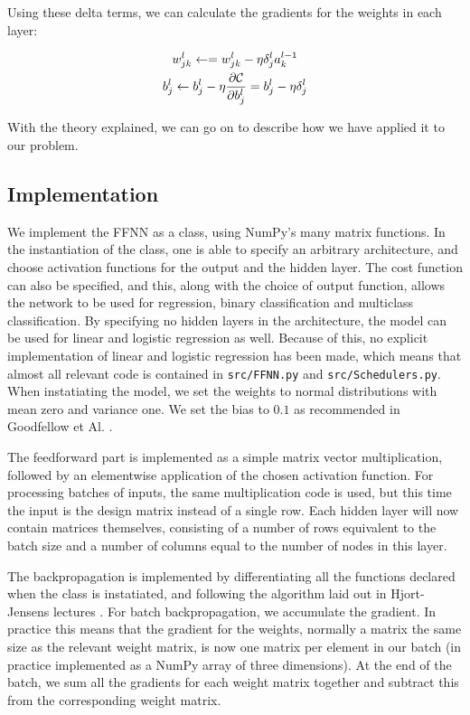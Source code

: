 \documentclass[onecolumn,10pt,cleanfoot]{asme2ej}
\begin{document}
Using these delta terms, we can calculate the gradients for the weights in each layer:

\begin{gather}
w_{jk}^l\leftarrow  = w_{jk}^l- \eta \delta_j^la_k^{l-1} \\
b_j^l \leftarrow b_j^l-\eta \frac{\partial {\cal C}}{\partial b_j^l}=b_j^l-\eta \delta_j^l
\end{gather}

With the theory explained, we can go on to describe how we have applied it to our problem.

\subsection{Implementation}

We implement the FFNN as a class, using NumPy's many matrix functions. In the instantiation of the class, one is able to specify an arbitrary architecture, and choose activation functions for the output and the hidden layer. The cost function can also be specified, and this, along with the choice of output function, allows the network to be used for regression, binary classification and multiclass classification. By specifying no hidden layers in the architecture, the model can be used for linear and logistic regression as well. Because of this, no explicit implementation of linear and logistic regression has been made, which means that almost all relevant code is contained in \texttt{src/FFNN.py} and \texttt{src/Schedulers.py}. When instatiating the model, we set the weights to normal distributions with mean zero and variance one. We set the bias to $0.1$ as recommended in Goodfellow et Al. \cite[189]{gbc}.

The feedforward part is implemented as a simple matrix vector multiplication, followed by an elementwise application of the chosen activation function. For processing batches of inputs, the same multiplication code is used, but this time the input is the design matrix instead of a single row. Each hidden layer will now contain matrices themselves, consisting of a number of rows equivalent to the batch size and a number of columns equal to the number of nodes in this layer.

The backpropagation is implemented by differentiating all the functions declared when the class is instatiated, and following the algorithm laid out in Hjort-Jensens lectures \cite{morten}. For batch backpropagation, we accumulate the gradient. In practice this means that the gradient for the weights, normally a matrix the same size as the relevant weight matrix, is now one matrix per element in our batch (in practice implemented as a NumPy array of three dimensions). At the end of the batch, we sum all the gradients for each weight matrix together and subtract this from the corresponding weight matrix.
\end{document}
